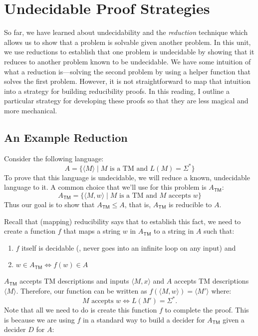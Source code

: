 \documentclass[11pt]{book}
\newcommand{\Atm}{A_{\mathsf{TM}}}
\newcommand{\desc}[1]{\langle #1 \rangle}
\begin{document}
\section*{Undecidable Proof Strategies}

So far, we have learned about undecidability and the \emph{reduction} technique which allows us to show that a problem is solvable given another problem.
In this unit, we use reductions to establish that one problem is undecidable by showing that it reduces to another problem known to be undecidable.
We have some intuition of what a reduction is---solving the second problem by using a helper function that solves the first problem.
However, it is not straightforward to map that intuition into a strategy for building reducibility proofs.
In this reading, I outline a particular strategy for developing these proofs so that they are less magical and more mechanical.

\subsection*{An Example Reduction}

Consider the following language:
\[
  A = \{ \desc{M} \mid \text{$M$ is a TM and $L(M) = \Sigma^*$} \}
\]
To prove that this language is undecidable, we will reduce a known, undecidable language to it.
A common choice that we'll use for this problem is $\Atm$:
\[
  \Atm = \{ \desc{M, w} \mid \text{$M$ is a TM and $M$ accepts $w$} \}
\]
Thus our goal is to show that $\Atm \leq A$, that is, $\Atm$ is reducible to $A$.

Recall that (mapping) reducibility says that to establish this fact, we need to create a function $f$ that maps a string $w$ in $\Atm$ to a string in $A$ such that:
\begin{enumerate}[itemsep=0pt]
  \item $f$ itself is decidable (\ie, never goes into an infinite loop on any input) and
  \item $w \in \Atm \Longleftrightarrow f(w) \in A$
\end{enumerate}
$\Atm$ accepts TM descriptions and inputs $\desc{M, x}$ and $A$ accepts TM descriptions $\desc{M}$.
Therefore, our function can be written as $f(\desc{M, w}) = \desc{M'}$ where:
\[
  \text{$M$ accepts $w$} \Longleftrightarrow \text{$L(M') = \Sigma^*$}.
\]
Note that all we need to do is create this function $f$ to complete the proof.
This is because we are using $f$ in a standard way to build a decider for $\Atm$ given a decider $D$ for $A$:
\end{document}
